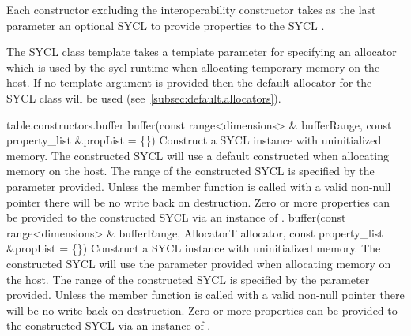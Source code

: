 Each constructor excluding the interoperability constructor takes as the last parameter an optional SYCL  to provide properties to the SYCL .

The SYCL  class template takes a template parameter  for specifying an allocator which is used by the \gls{sycl-runtime} when allocating temporary memory on the host. If no template argument is provided then the default allocator for the SYCL  class  will be used (see~\ref{subsec:default.allocators}).



{table.constructors.buffer}
  \addRowTwoSL
    {  buffer(const range<dimensions> \& bufferRange, }
    {  const property_list \&propList = \{\}) }
    {
       Construct a SYCL  instance with uninitialized memory.      
       The constructed SYCL  will use a default constructed  when allocating memory on the host.
        The range of the constructed SYCL  is specified by the  parameter provided.
       Unless the member function  is called with a valid non-null pointer there will be no write back on destruction.
       Zero or more properties can be provided to the constructed SYCL  via an instance of .
    }
  \addRowThreeSL
    {  buffer(const range<dimensions> \& bufferRange, }
    {  AllocatorT allocator, }
    {  const property_list \&propList = \{\}) }
    {
       Construct a SYCL  instance with uninitialized memory.      
       The constructed SYCL  will use the  parameter provided when allocating memory on the host.
       The range of the constructed SYCL  is specified by the  parameter provided.
       Unless the member function  is called with a valid non-null pointer there will be no write back on destruction.
       Zero or more properties can be provided to the constructed SYCL  via an instance of .
     }
  \addRowThreeSL
